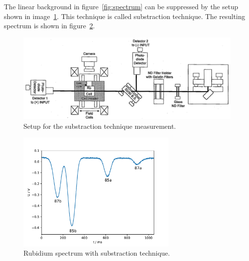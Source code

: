 The linear background in figure~\ref{fig:spectrum} can be suppressed by the
setup shown in image~\ref{fig:setup_substraction}.
This technique is called substraction technique.
The resulting spectrum is shown in figure~\ref{fig:spectrum_sub}.

\begin{figure}
  \centering
  \includegraphics[width=\textwidth]{Pics/setup_substraction.png}
  \caption{Setup for the substraction technique measurement.\cite{anleitung}}
  \label{fig:setup_substraction}
\end{figure}


\begin{figure}
  \centering
  \includegraphics[width=0.7\textwidth]{Pics/Rb_spectrum_subst.pdf}
  \caption{Rubidium spectrum with substraction technique.}
  \label{fig:spectrum_sub}
\end{figure}
